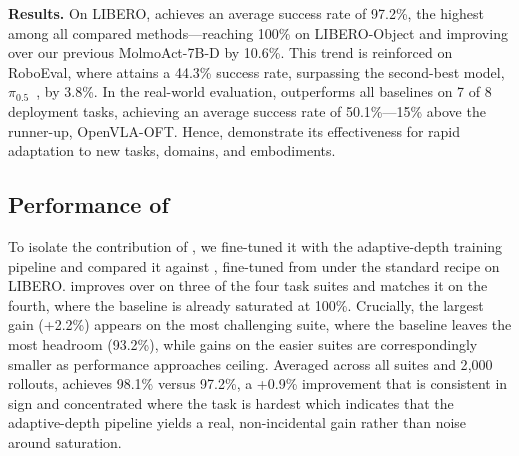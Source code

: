 \textbf{Results.} On LIBERO, \molmoactt achieves an average success rate of 97.2\%, the highest among all compared methods—reaching 100\% on LIBERO-Object and improving over our previous MolmoAct-7B-D by 10.6\%. This trend is reinforced on RoboEval, where \molmoactt attains a 44.3\% success rate, surpassing the second-best model, $\pi_{0.5}$~\citep{intelligence2025pi05visionlanguageactionmodelopenworld}, by 3.8\%. In the real-world evaluation, \molmoactt outperforms all baselines on 7 of 8 deployment tasks, achieving an average success rate of 50.1\%—15\% above the runner-up, OpenVLA-OFT. Hence, \molmoactt demonstrate its effectiveness for rapid adaptation to new tasks, domains, and embodiments.

\subsection{Performance of \molmothink}
\label{depth}
To isolate the contribution of \molmothink, we fine-tuned it with the adaptive-depth training pipeline and compared it against \molmoactt, fine-tuned from \molmoacttpos under the standard recipe on LIBERO. \molmothink improves over \molmoactt on three of the four task suites and matches it on the fourth, where the baseline is already saturated at 100\%. Crucially, the largest gain (+2.2\%) appears on the most challenging suite, where the baseline leaves the most headroom (93.2\%), while gains on the easier suites are correspondingly smaller as performance approaches ceiling. Averaged across all suites and 2{,}000 rollouts, \molmothink achieves 98.1\% versus 97.2\%, a +0.9\% improvement that is consistent in sign and concentrated where the task is hardest which indicates that the adaptive-depth pipeline yields a real, non-incidental gain rather than noise around saturation.

